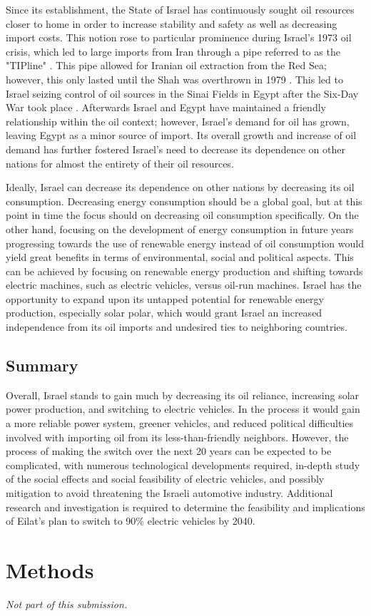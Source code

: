 \documentclass{report}                         %
\begin{document}
Since its establishment, the State of Israel has continuously sought oil resources closer to home in order to increase stability and safety as well as decreasing import costs. This notion rose to particular prominence during Israel's 1973 oil crisis, which led to large imports from Iran through a pipe referred to as the "TIPline" \cite{Engber2006WhereOil}. This pipe allowed for Iranian oil extraction from the Red Sea; however, this only lasted until the Shah was overthrown in 1979 \cite{Engber2006WhereOil}. This led to Israel seizing control of oil sources in the Sinai Fields in Egypt after the Six-Day War took place \cite{Engber2006WhereOil}.  Afterwards Israel and Egypt have maintained a friendly relationship within the oil context; however, Israel's demand for oil has grown, leaving Egypt as a minor source of import. Its overall growth and increase of oil demand has further fostered Israel's need to decrease its dependence on other nations for almost the entirety of their oil resources. 

Ideally, Israel can decrease its dependence on other nations by decreasing its oil consumption. Decreasing energy consumption should be a global goal, but at this point in time the focus should on decreasing oil consumption specifically. On the other hand, focusing on the development of energy consumption in future years progressing towards the use of renewable energy instead of oil consumption would yield great benefits in terms of environmental, social and political aspects. This can be achieved by focusing on renewable energy production and shifting towards electric machines, such as electric vehicles, versus oil-run machines. Israel has the opportunity to expand upon its untapped potential for renewable energy production, especially solar polar, which would grant Israel an increased independence from its oil imports and undesired ties to neighboring countries. 

\section{Summary}

Overall, Israel stands to gain much by decreasing its oil reliance, increasing solar power production, and switching to electric vehicles. In the process it would gain a more reliable power system, greener vehicles, and reduced political difficulties involved with importing oil from its less-than-friendly neighbors. However, the process of making the switch over the next 20 years can be expected to be complicated, with numerous technological developments required, in-depth study of the social effects and social feasibility of electric vehicles, and possibly mitigation to avoid threatening the Israeli automotive industry. Additional research and investigation is required to determine the feasibility and implications of Eilat's plan to switch to 90\% electric vehicles by 2040.\

\newpage
\chapter{Methods}
\textit{Not part of this submission.}

\newpage
\bigskip


\end{document}
